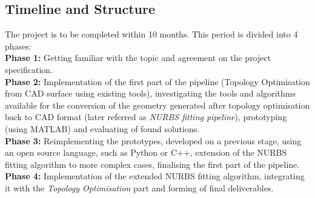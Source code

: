 \subsection{Timeline and Structure}
The project is to be completed within 10 months. This period is divided into 4 phases:\\

\textbf{Phase 1:} Getting familiar with the topic and agreement on the project specification.\\

\textbf{Phase 2:} Implementation of the first part of the pipeline (Topology Optimisation from CAD surface using existing tools), investigating the tools and algorithms available for the conversion of the geometry generated after topology optimisation back to CAD format (later referred as \textit{NURBS fitting pipeline}), prototyping (using MATLAB) and evaluating of found solutions.\\

\textbf{Phase 3:} Reimplementing the prototypes, developed on a previous stage, using an open source language, such as Python or C++, extension of the NURBS fitting algorithm to more complex cases, finalising the first part of the pipeline.\\

\textbf{Phase 4:} Implementation of the extended NURBS fitting algorithm, integrating it with the \textit{Topology Optimisation} part and forming of final deliverables.

